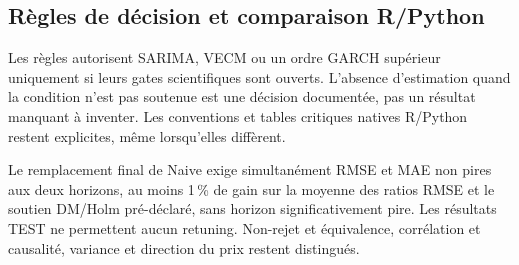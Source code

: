 
\FloatBarrier

\subsection{Règles de décision et comparaison R/Python}
Les règles autorisent SARIMA, VECM ou un ordre GARCH supérieur uniquement si
leurs gates scientifiques sont ouverts. L'absence d'estimation quand la
condition n'est pas soutenue est une décision documentée, pas un résultat
manquant à inventer. Les conventions et tables critiques natives R/Python
restent explicites, même lorsqu'elles diffèrent.

Le remplacement final de Naive exige simultanément RMSE et MAE non pires aux
deux horizons, au moins 1\,\% de gain sur la moyenne des ratios RMSE et le soutien
DM/Holm pré-déclaré, sans horizon significativement pire. Les résultats TEST
ne permettent aucun retuning. Non-rejet et équivalence, corrélation et causalité,
variance et direction du prix restent distingués.

